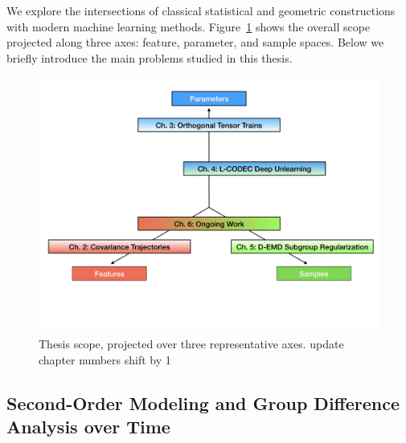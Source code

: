 We explore the intersections of classical statistical and geometric constructions with modern machine learning methods. 
Figure~\ref{fig:scope} shows the overall scope projected along three axes: feature, parameter, and sample spaces.
Below we briefly introduce the main problems studied in this thesis.
\begin{figure}[!ht]
    \centering
    \includegraphics[width=0.95\linewidth]{diss/1_intro/figs/thesis_scope.png}
    \caption[Thesis Scope]{Thesis scope, projected over three representative axes. {\color{red} update chapter numbers shift by 1}}
    \label{fig:scope}
\end{figure}

\subsection{Second-Order Modeling and Group Difference Analysis over Time}

